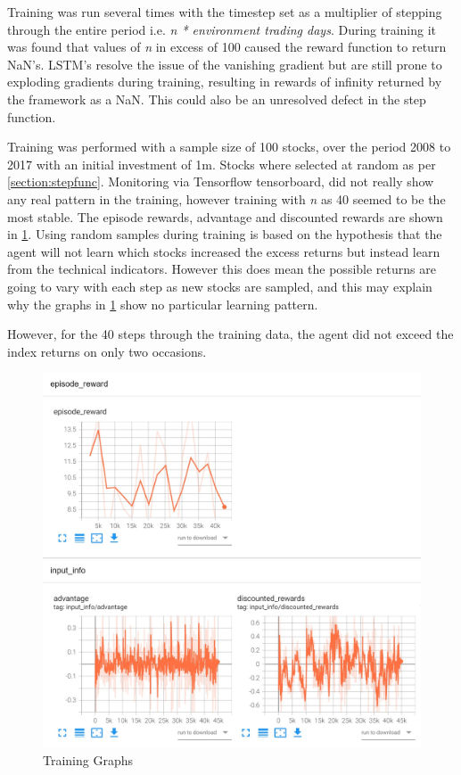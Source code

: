 \documentclass[oneside,12pt]{Classes/RoboticsLaTeX}
\begin{document}
Training was run several times with the timestep set as a multiplier of stepping through the entire period i.e. \textit{n * environment trading days}.  During training it was found that values of \textit{n} in excess of 100 caused the reward function to return NaN's.  LSTM's resolve the issue of the vanishing gradient but are still prone to exploding gradients during training, resulting in rewards of infinity returned by the framework as a NaN. This could also be an unresolved defect in the step function.

Training was performed with a sample size of 100 stocks, over the period 2008 to 2017 with an initial investment of 1m. Stocks where selected at random as per \ref{section:stepfunc}.
Monitoring via Tensorflow tensorboard, did not really show any real pattern in the training, however training with \textit{n} as 40 seemed to be the most stable. The episode rewards, advantage and discounted rewards are shown in \ref{fig:tensorboard}. 
Using random samples during training is based on the hypothesis that the agent will not learn which stocks increased the excess returns but instead learn from the technical indicators. However this does mean the possible returns are going to vary with each step as new stocks are sampled, and this may explain why the graphs in \ref{fig:tensorboard} show no particular learning pattern.

However, for the 40 steps through the training data, the agent did not exceed the index returns on only two occasions. 

\begin{figure}[h]
    \centering
    \includegraphics[width=15cm]{Figures/Training.jpg}
    \caption{Training Graphs}
    \label{fig:tensorboard}
\end{figure}
\end{document}
